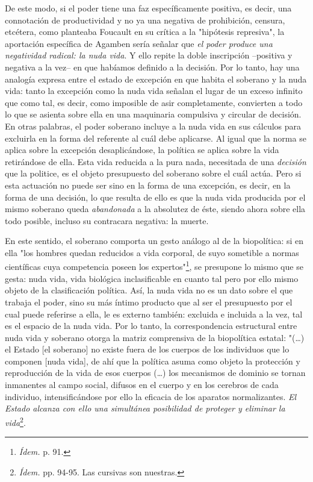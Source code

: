 \documentclass{book}
\begin{document}
De este modo, si el poder tiene una faz específicamente positiva, es
decir, una connotación de productividad y no ya una negativa de
prohibición, censura, etcétera, como planteaba Foucault en su crítica a
la "hipótesis represiva", la aportación específica de Agamben sería
señalar que \emph{el poder produce una negatividad radical: la nuda
vida}. Y ello repite la doble inscripción --positiva y negativa a la
vez-- en que habíamos definido a la decisión. Por lo tanto, hay una
analogía expresa entre el estado de excepción en que habita el soberano
y la nuda vida: tanto la excepción como la nuda vida señalan el lugar de
un exceso infinito que como tal, es decir, como imposible de asir
completamente, convierten a todo lo que se asienta sobre ella en una
maquinaria compulsiva y circular de decisión. En otras palabras, el
poder soberano incluye a la nuda vida en sus cálculos para excluirla en
la forma del referente al cuál debe aplicarse. Al igual que la norma se
aplica sobre la excepción desaplicándose, la política se aplica sobre la
vida retirándose de ella. Esta vida reducida a la pura nada, necesitada
de una \emph{decisión} que la politice, es el objeto presupuesto del
soberano sobre el cuál actúa. Pero si esta actuación no puede ser sino
en la forma de una excepción, es decir, en la forma de una decisión, lo
que resulta de ello es que la nuda vida producida por el mismo soberano
queda \emph{abandonada} a la absolutez de éste, siendo ahora sobre ella
todo posible, incluso su contracara negativa: la muerte.

En este sentido, el soberano comporta un gesto análogo al de la
biopolítica: si en ella "los hombres quedan reducidos a vida corporal,
de suyo sometible a normas científicas cuya competencia poseen los
expertos"\footnote{\emph{Ídem.} p. 91.}, se presupone lo mismo que se
gesta: nuda vida, vida biológica inclasificable en cuanto tal pero por
ello mismo objeto de la clasificación política. Así, la nuda vida no es
un dato sobre el que trabaja el poder, sino su más íntimo producto que
al ser el presupuesto por el cual puede referirse a ella, le es externo
también: excluida e incluida a la vez, tal es el espacio de la nuda
vida. Por lo tanto, la correspondencia estructural entre nuda vida y
soberano otorga la matriz comprensiva de la biopolítica estatal:
"(\dots) el Estado {[}el soberano{]} no existe fuera de los cuerpos
de los individuos que lo componen {[}nuda vida{]}, de ahí que la
política asuma como objeto la protección y reproducción de la vida de
esos cuerpos (\dots) los mecanismos de dominio se tornan inmanentes
al campo social, difusos en el cuerpo y en los cerebros de cada
individuo, intensificándose por ello la eficacia de los aparatos
normalizantes. \emph{El Estado alcanza con ello una simultánea
posibilidad de proteger y eliminar la vida}\footnote{\emph{Ídem.} pp.
  94-95. Las cursivas son nuestras.}.
\end{document}

